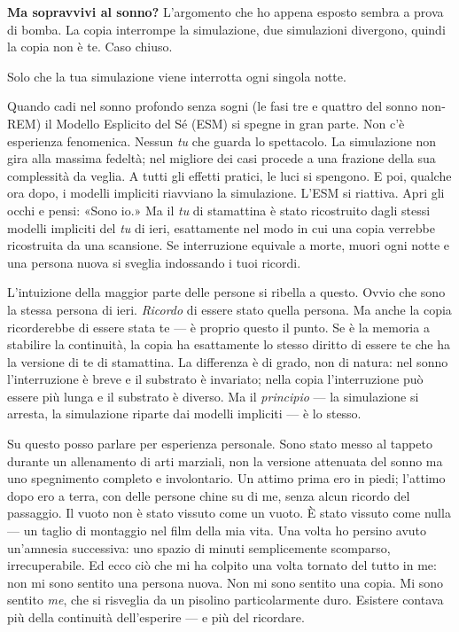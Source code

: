 \documentclass[11pt, twoside, openright]{book}
\begin{document}
\textbf{Ma sopravvivi al sonno?} L'argomento che ho appena esposto sembra a prova di bomba. La copia interrompe la simulazione, due simulazioni divergono, quindi la copia non è te. Caso chiuso.

Solo che la tua simulazione viene interrotta ogni singola notte.

Quando cadi nel sonno profondo senza sogni (le fasi tre e quattro del sonno non-REM) il Modello Esplicito del Sé (ESM) si spegne in gran parte. Non c'è esperienza fenomenica. Nessun \textit{tu} che guarda lo spettacolo. La simulazione non gira alla massima fedeltà; nel migliore dei casi procede a una frazione della sua complessità da veglia. A tutti gli effetti pratici, le luci si spengono. E poi, qualche ora dopo, i modelli impliciti riavviano la simulazione. L'ESM si riattiva. Apri gli occhi e pensi: «Sono io.» Ma il \textit{tu} di stamattina è stato ricostruito dagli stessi modelli impliciti del \textit{tu} di ieri, esattamente nel modo in cui una copia verrebbe ricostruita da una scansione. Se interruzione equivale a morte, muori ogni notte e una persona nuova si sveglia indossando i tuoi ricordi.

L'intuizione della maggior parte delle persone si ribella a questo. Ovvio che sono la stessa persona di ieri. \textit{Ricordo} di essere stato quella persona. Ma anche la copia ricorderebbe di essere stata te --- è proprio questo il punto. Se è la memoria a stabilire la continuità, la copia ha esattamente lo stesso diritto di essere te che ha la versione di te di stamattina. La differenza è di grado, non di natura: nel sonno l'interruzione è breve e il substrato è invariato; nella copia l'interruzione può essere più lunga e il substrato è diverso. Ma il \textit{principio} --- la simulazione si arresta, la simulazione riparte dai modelli impliciti --- è lo stesso.

Su questo posso parlare per esperienza personale. Sono stato messo al tappeto durante un allenamento di arti marziali, non la versione attenuata del sonno ma uno spegnimento completo e involontario. Un attimo prima ero in piedi; l'attimo dopo ero a terra, con delle persone chine su di me, senza alcun ricordo del passaggio. Il vuoto non è stato vissuto come un vuoto. È stato vissuto come nulla --- un taglio di montaggio nel film della mia vita. Una volta ho persino avuto un'amnesia successiva: uno spazio di minuti semplicemente scomparso, irrecuperabile. Ed ecco ciò che mi ha colpito una volta tornato del tutto in me: non mi sono sentito una persona nuova. Non mi sono sentito una copia. Mi sono sentito \textit{me}, che si risveglia da un pisolino particolarmente duro. Esistere contava più della continuità dell'esperire --- e più del ricordare.
\end{document}
